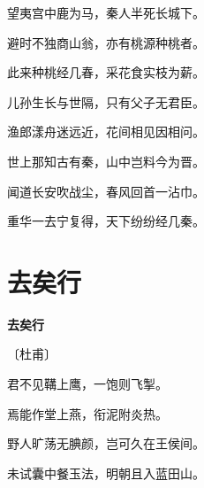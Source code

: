 \documentclass[12pt,UTF-8,openany,fontset=none]{ctexbook}
\begin{document}
    \vspace{18pt}  %

\begin{center}
    \begin{Large}

        望夷宫中鹿为马，秦人半死长城下。

        避时不独商山翁，亦有桃源种桃者。

        此来种桃经几春，采花食实枝为薪。

        儿孙生长与世隔，只有父子无君臣。

        渔郎漾舟迷远近，花间相见因相问。

        世上那知古有秦，山中岂料今为晋。

        闻道长安吹战尘，春风回首一沾巾。

        重华一去宁复得，天下纷纷经几秦。

    \end{Large}

\end{center}

\vspace{8pt}
\clearpage

\section{去矣行}


\begin{center}
    {\bfseries 去矣行}

    \vspace{18pt}

    \begin{large}\xuwen
        〔杜甫〕
    \end{large}

\end{center}

    \vspace{18pt}  %

\begin{center}
    \begin{Large}

        君不见鞲上鹰，一饱则飞掣。

        焉能作堂上燕，衔泥附炎热。

        野人旷荡无腆颜，岂可久在王侯间。

        未试囊中餐玉法，明朝且入蓝田山。

    \end{Large}

\end{center}
\end{document}
